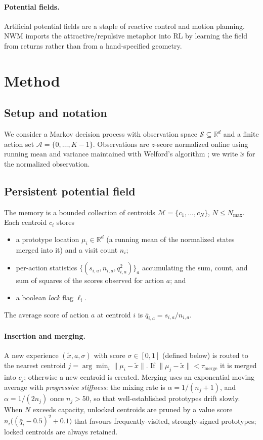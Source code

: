 \documentclass[11pt]{article}
\newcommand{\R}{\mathbb{R}}
\newcommand{\NWM}{\textsc{NWM}}
\begin{document}
\paragraph{Potential fields.} Artificial potential fields
\citep{khatib1986real} are a staple of reactive control and motion planning.
\NWM{} imports the attractive/repulsive metaphor into RL by learning the field
from returns rather than from a hand-specified geometry.

\section{Method}
\label{sec:method}

\subsection{Setup and notation}
We consider a Markov decision process with observation space
$\mathcal{S}\subseteq\R^{d}$ and a finite action set
$\mathcal{A}=\{0,\dots,K{-}1\}$. Observations are $z$-score normalized online
using running mean and variance maintained with Welford's algorithm
\citep{welford1962note}; we write $\tilde{x}$ for the normalized observation.

\subsection{Persistent potential field}
The memory is a bounded collection of centroids
$\mathcal{M}=\{c_1,\dots,c_N\}$, $N\le N_{\max}$. Each centroid $c_i$ stores
\begin{itemize}
  \item a prototype location $\mu_i\in\R^{d}$ (a running mean of the normalized
  states merged into it) and a visit count $n_i$;
  \item per-action statistics $\{(s_{i,a}, n_{i,a}, q^{2}_{i,a})\}_{a}$
  accumulating the sum, count, and sum of squares of the scores observed for
  action $a$; and
  \item a boolean \emph{lock} flag $\ell_i$.
\end{itemize}
The average score of action $a$ at centroid $i$ is
$\bar q_{i,a}=s_{i,a}/n_{i,a}$.

\paragraph{Insertion and merging.} A new experience
$(\tilde x, a, \sigma)$ with score $\sigma\in[0,1]$ (defined below) is routed to
the nearest centroid $j=\arg\min_i \lVert \mu_i-\tilde x\rVert$. If
$\lVert \mu_j-\tilde x\rVert < \tau_{\mathrm{merge}}$ it is merged into $c_j$;
otherwise a new centroid is created. Merging uses an exponential moving average
with \emph{progressive stiffness}: the mixing rate is $\alpha=1/(n_j{+}1)$, and
$\alpha=1/(2n_j)$ once $n_j>50$, so that well-established prototypes drift
slowly. When $N$ exceeds capacity, unlocked centroids are pruned by a value
score $n_i\big((\bar q_i-0.5)^2+0.1\big)$ that favours frequently-visited,
strongly-signed prototypes; locked centroids are always retained.
\end{document}
